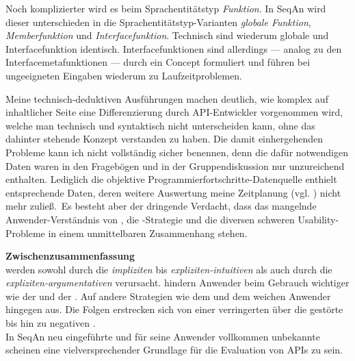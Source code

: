 \begin{itemize}
\begin{description}
    Noch komplizierter wird es beim Sprachentitätstyp \textit{Funktion}. In SeqAn wird dieser unterschieden in die Sprachentitätstyp-Varianten \textit{globale Funktion}, \textit{Memberfunktion} und \textit{Interfacefunktion}. Technisch sind wiederum globale und Interfacefunktion identisch. Interfacefunktionen sind allerdings --- analog zu den Interfacemetafunktionen --- durch ein Concept formuliert und führen bei ungeeigneten Eingaben wiederum zu Laufzeitproblemen.
    
    Meine technisch-deduktiven Ausführungen machen deutlich, wie komplex auf inhaltlicher Seite eine Differenzierung durch API-Entwickler vorgenommen wird, welche man technisch und syntaktisch nicht unterscheiden kann, ohne das dahinter stehende Konzept verstanden zu haben. Die damit einhergehenden Probleme kann ich nicht vollständig sicher benennen, denn die dafür notwendigen Daten waren in den Fragebögen und in der Gruppendiskussion nur unzureichend enthalten. Lediglich die objektive Programmierfortschritte-Datenquelle enthielt entsprechende Daten, deren weitere Auswertung meine Zeitplanung (vgl. ) nicht mehr zuließ. Es besteht aber der dringende Verdacht, dass das mangelnde Anwender-Verständnis von , die -Strategie und die diversen schweren Usability-Probleme in einem unmittelbaren Zusammenhang stehen.
  \end{description}
  
  \textbf{Zwischenzusammenfassung}\\
   werden sowohl durch die \textit{impliziten} bis \textit{expliziten-intuitiven}  als auch durch die \textit{expliziten-argumentativen}  verursacht.  hindern Anwender beim Gebrauch wichtiger  wie der  und der . Auf andere Strategien wie dem  und dem  weichen Anwender hingegen aus. Die Folgen erstrecken sich von einer verringerten  über die gestörte   bis hin zu negativen .
  \\In SeqAn neu eingeführte und für seine Anwender vollkommen unbekannte  scheinen eine vielversprechender Grundlage für die Evaluation von APIs zu sein.
  

\end{itemize}
